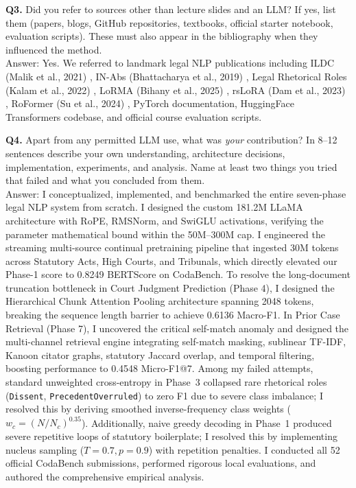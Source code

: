 \documentclass[11pt, oneside]{article}
\begin{document}
\noindent
\textbf{Q3.} Did you refer to sources other than lecture slides and an LLM?
If yes, list them (papers, blogs, GitHub repositories, textbooks, official starter notebook, evaluation scripts). These must also appear in the bibliography when they influenced the method. \\[0.4em]
Answer: Yes. We referred to landmark legal NLP publications including ILDC (Malik et al., 2021) \cite{malik2021ildc}, IN-Abs (Bhattacharya et al., 2019) \cite{bhattacharya2019inabs}, Legal Rhetorical Roles (Kalam et al., 2022) \cite{kalam2022rhetorical}, LoRMA (Bihany et al., 2025) \cite{bihany2025lorma}, rsLoRA (Dam et al., 2023) \cite{dam2023rslora}, RoFormer (Su et al., 2024) \cite{su2024roformer}, PyTorch documentation, HuggingFace Transformers codebase, and official course evaluation scripts.
\medskip

\noindent
\textbf{Q4.} Apart from any permitted LLM use, what was \emph{your} contribution? In 8--12 sentences describe your own understanding, architecture decisions, implementation, experiments, and analysis. Name at least two things you tried that failed and what you concluded from them. \\[0.4em]
Answer: I conceptualized, implemented, and benchmarked the entire seven-phase legal NLP system from scratch. I designed the custom 181.2M LLaMA architecture with RoPE, RMSNorm, and SwiGLU activations, verifying the parameter mathematical bound within the 50M--300M cap. I engineered the streaming multi-source continual pretraining pipeline that ingested 30M tokens across Statutory Acts, High Courts, and Tribunals, which directly elevated our Phase-1 score to 0.8249 BERTScore on CodaBench. To resolve the long-document truncation bottleneck in Court Judgment Prediction (Phase 4), I designed the Hierarchical Chunk Attention Pooling architecture spanning 2048 tokens, breaking the sequence length barrier to achieve 0.6136 Macro-F1. In Prior Case Retrieval (Phase 7), I uncovered the critical self-match anomaly and designed the multi-channel retrieval engine integrating self-match masking, sublinear TF-IDF, Kanoon citator graphs, statutory Jaccard overlap, and temporal filtering, boosting performance to 0.4548 Micro-F1@7. Among my failed attempts, standard unweighted cross-entropy in Phase~3 collapsed rare rhetorical roles (\texttt{Dissent}, \texttt{PrecedentOverruled}) to zero F1 due to severe class imbalance; I resolved this by deriving smoothed inverse-frequency class weights ($w_c = (N/N_c)^{0.35}$). Additionally, naive greedy decoding in Phase~1 produced severe repetitive loops of statutory boilerplate; I resolved this by implementing nucleus sampling ($T=0.7, p=0.9$) with repetition penalties. I conducted all 52 official CodaBench submissions, performed rigorous local evaluations, and authored the comprehensive empirical analysis.

\clearpage


\end{document}
